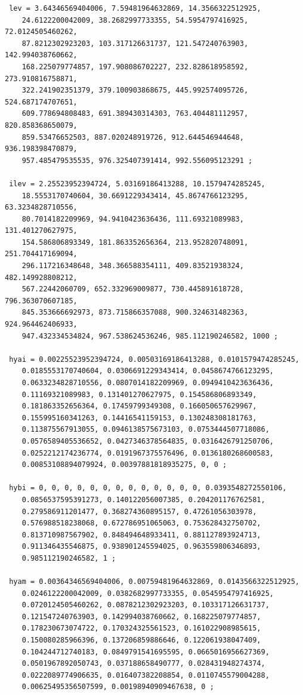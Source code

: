 \documentclass[times,doublespace]{fldauth}
\begin{document}
{\begin{appendix}
\begin{verbatim}
 lev = 3.64346569404006, 7.59481964632869, 14.3566322512925, 
    24.6122200042009, 38.2682997733355, 54.5954797416925, 72.0124505460262, 
    87.8212302923203, 103.317126631737, 121.547240763903, 142.994038760662, 
    168.225079774857, 197.908086702227, 232.828618958592, 273.910816758871, 
    322.241902351379, 379.100903868675, 445.992574095726, 524.687174707651, 
    609.778694808483, 691.389430314303, 763.404481112957, 820.858368650079, 
    859.53476652503, 887.020248919726, 912.644546944648, 936.198398470879, 
    957.485479535535, 976.325407391414, 992.556095123291 ;

 ilev = 2.25523952394724, 5.03169186413288, 10.1579474285245, 
    18.5553170740604, 30.6691229343414, 45.8674766123295, 63.3234828710556, 
    80.7014182209969, 94.9410423636436, 111.69321089983, 131.401270627975, 
    154.586806893349, 181.863352656364, 213.952820748091, 251.704417169094, 
    296.117216348648, 348.366588354111, 409.83521938324, 482.149928808212, 
    567.22442060709, 652.332969009877, 730.445891618728, 796.363070607185, 
    845.353666692973, 873.715866357088, 900.324631482363, 924.964462406933, 
    947.432334534824, 967.538624536246, 985.112190246582, 1000 ;

 hyai = 0.00225523952394724, 0.00503169186413288, 0.0101579474285245, 
    0.0185553170740604, 0.0306691229343414, 0.0458674766123295, 
    0.0633234828710556, 0.0807014182209969, 0.0949410423636436, 
    0.11169321089983, 0.131401270627975, 0.154586806893349, 
    0.181863352656364, 0.17459799349308, 0.166050657629967, 
    0.155995160341263, 0.14416541159153, 0.130248308181763, 
    0.113875567913055, 0.0946138575673103, 0.0753444507718086, 
    0.0576589405536652, 0.0427346378564835, 0.0316426791250706, 
    0.0252212174236774, 0.0191967375576496, 0.0136180268600583, 
    0.00853108894079924, 0.00397881818935275, 0, 0 ;

 hybi = 0, 0, 0, 0, 0, 0, 0, 0, 0, 0, 0, 0, 0, 0.0393548272550106, 
    0.0856537595391273, 0.140122056007385, 0.204201176762581, 
    0.279586911201477, 0.368274360895157, 0.47261056303978, 
    0.576988518238068, 0.672786951065063, 0.753628432750702, 
    0.813710987567902, 0.848494648933411, 0.881127893924713, 
    0.911346435546875, 0.938901245594025, 0.963559806346893, 
    0.985112190246582, 1 ;

 hyam = 0.00364346569404006, 0.00759481964632869, 0.0143566322512925, 
    0.0246122200042009, 0.0382682997733355, 0.0545954797416925, 
    0.0720124505460262, 0.0878212302923203, 0.103317126631737, 
    0.121547240763903, 0.142994038760662, 0.168225079774857, 
    0.178230673074722, 0.170324325561523, 0.161022908985615, 
    0.150080285966396, 0.137206859886646, 0.122061938047409, 
    0.104244712740183, 0.0849791541695595, 0.0665016956627369, 
    0.0501967892050743, 0.037188658490777, 0.028431948274374, 
    0.0222089774906635, 0.016407382208854, 0.0110745579004288, 
    0.00625495356507599, 0.00198940909467638, 0 ;


\end{verbatim}
\end{appendix}}
\end{document}
